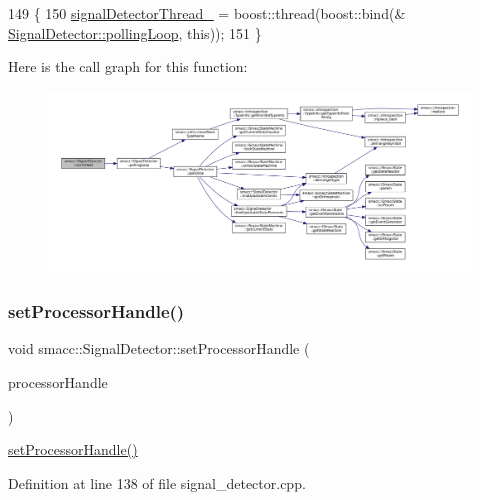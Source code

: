 \begin{DoxyCode}
149     \{
150         \hyperlink{classsmacc_1_1SignalDetector_a4346a400cd37eafc5d1d2e63d975785e}{signalDetectorThread\_} = boost::thread(boost::bind(&
      \hyperlink{classsmacc_1_1SignalDetector_a2665e66cdae9f6533c64bbcecf3fa199}{SignalDetector::pollingLoop}, \textcolor{keyword}{this}));
151     \}
\end{DoxyCode}
Here is the call graph for this function\+:
\nopagebreak
\begin{figure}[H]
\begin{center}
\leavevmode
\includegraphics[width=350pt]{classsmacc_1_1SignalDetector_a48b3fee853ddcb25732408b22ecfcf39_cgraph}
\end{center}
\end{figure}
\mbox{\label{classsmacc_1_1SignalDetector_ac1197a77c32a3b817005391e550ce646}} 
\subsubsection{\texorpdfstring{set\+Processor\+Handle()}{setProcessorHandle()}}
{\footnotesize\ttfamily void smacc\+::\+Signal\+Detector\+::set\+Processor\+Handle (\begin{DoxyParamCaption}\item[{Smacc\+Fifo\+Scheduler\+::processor\+\_\+handle}]{processor\+Handle }\end{DoxyParamCaption})}

\hyperlink{classsmacc_1_1SignalDetector_ac1197a77c32a3b817005391e550ce646}{set\+Processor\+Handle()} 

Definition at line 138 of file signal\+\_\+detector.\+cpp.



